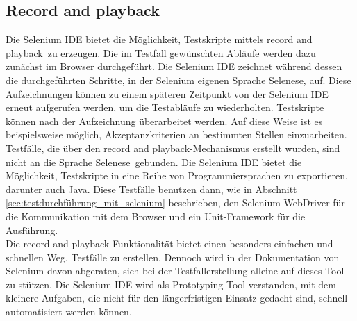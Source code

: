 \subsection{Record and playback}
\label{sec:recorde_and_playback}
Die Selenium IDE bietet die Möglichkeit, Testskripte mittels \grq record and playback\grq\ zu erzeugen.
Die im Testfall gewünschten Abläufe werden dazu zunächst im Browser durchgeführt.
Die Selenium IDE zeichnet während dessen die durchgeführten Schritte, in der Selenium eigenen Sprache \grq Selenese\grq, auf. Diese Aufzeichnungen können zu einem späteren Zeitpunkt von der Selenium IDE erneut aufgerufen werden, um die Testabläufe zu wiederholten.
Testskripte können nach der Aufzeichnung überarbeitet werden. Auf diese Weise ist es beispielsweise möglich, Akzeptanzkriterien an bestimmten Stellen einzuarbeiten.\\
Testfälle, die über den \grq record and playback\grq -Mechanismus erstellt wurden, sind nicht an die Sprache \grq Selenese\grq\ gebunden. Die Selenium IDE bietet die Möglichkeit, Testskripte in eine Reihe von Programmiersprachen zu exportieren, darunter auch Java.
Diese Testfälle benutzen dann, wie in Abschnitt \ref{sec:testdurchführung_mit_selenium} beschrieben, den Selenium WebDriver für die Kommunikation mit dem Browser und ein Unit-Framework für die Ausführung.\\
Die \grq record and playback\grq -Funktionalität bietet einen besonders einfachen und schnellen Weg, Testfälle zu erstellen. Dennoch wird in der Dokumentation von Selenium \cite{selenium_selenium_2015-1} davon abgeraten, sich bei der Testfallerstellung alleine auf dieses Tool zu stützen. Die Selenium IDE wird als Prototyping-Tool verstanden, mit dem kleinere Aufgaben, die nicht für den längerfristigen Einsatz gedacht sind, schnell automatisiert werden können.

